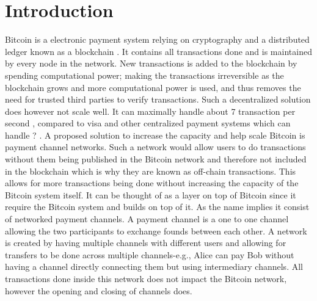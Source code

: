 \chapter{Introduction}
\label{chap:introduction}

Bitcoin is a electronic payment system relying on cryptography and a distributed ledger known as a blockchain \cite{nakamoto2008}. 
It contains all transactions done and is maintained by every node in the network. New transactions is added to the blockchain by spending computational power; making the transactions irreversible as the blockchain grows and more computational power is used, and thus removes the need for trusted third parties to verify transactions. Such a decentralized solution does however not scale well. It can maximally handle about 7 transaction per second , compared to visa and other centralized payment systems which can handle ? .
A proposed solution to increase the capacity and help scale Bitcoin is payment channel networks. Such a network would allow users to do  transactions without them being published in the Bitcoin network and therefore not included in the blockchain which is why they are known as off-chain transactions. This allows for more transactions being done without increasing the capacity of the Bitcoin system itself. It can be thought of as a layer on top of Bitcoin since it require the Bitcoin system and builds on top of it. As the name implies it consist of networked payment channels. A payment channel is a one to one channel allowing the two participants to exchange founds between each other. A network is created by having multiple channels with different users and allowing for transfers to be done across multiple channels-e.g., Alice can pay Bob without having a channel directly connecting them but using intermediary channels. All transactions done inside this network does not impact the Bitcoin network, however the opening and closing of channels does.
\\ 

